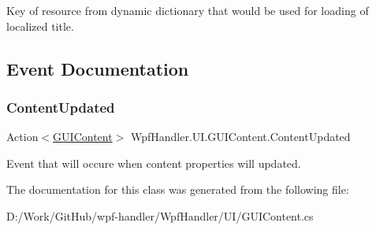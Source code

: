 Key of resource from dynamic dictionary that would be used for loading of localized title. 



\subsection{Event Documentation}
\mbox{\label{class_wpf_handler_1_1_u_i_1_1_g_u_i_content_a165b9cf266e359c62f576b07ee9865ad}} 
\subsubsection{\texorpdfstring{Content\+Updated}{ContentUpdated}}
{\footnotesize\ttfamily Action$<$\mbox{\hyperlink{class_wpf_handler_1_1_u_i_1_1_g_u_i_content}{G\+U\+I\+Content}}$>$ Wpf\+Handler.\+U\+I.\+G\+U\+I\+Content.\+Content\+Updated}



Event that will occure when content properties will updated. 



The documentation for this class was generated from the following file\+:\begin{DoxyCompactItemize}
\item 
D\+:/\+Work/\+Git\+Hub/wpf-\/handler/\+Wpf\+Handler/\+U\+I/G\+U\+I\+Content.\+cs\end{DoxyCompactItemize}
